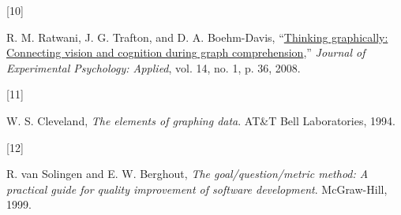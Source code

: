 \documentclass[
  10pt,
  conference,
]{IEEEtran}%
\newlength{\cslhangindent}
\newlength{\csllabelwidth}
\newenvironment{CSLReferences}[2] %
 {\begin{list}{}{%
  \setlength{\itemindent}{0pt}
  \setlength{\leftmargin}{0pt}
  \setlength{\parsep}{0pt}
  \ifodd #1
   \setlength{\leftmargin}{\cslhangindent}
   \setlength{\itemindent}{-1\cslhangindent}
  \fi
  \setlength{\itemsep}{#2\baselineskip}}}
 {\end{list}}
\newcommand{\CSLLeftMargin}[1]{\parbox[t]{\csllabelwidth}{\strut#1\strut}}
\newcommand{\CSLRightInline}[1]{\parbox[t]{\linewidth - \csllabelwidth}{\strut#1\strut}}
\providecommand{\bibfont}{\footnotesize}
\begin{document}
\begin{CSLReferences}{0}{0}
\CSLLeftMargin{{[}10{]} }%
\CSLRightInline{R. M. Ratwani, J. G. Trafton, and D. A. Boehm-Davis,
{``\href{https://doi.org/10.1037/1076-898X.14.1.36}{Thinking
graphically: Connecting vision and cognition during graph
comprehension},''} \emph{Journal of Experimental Psychology: Applied},
vol. 14, no. 1, p. 36, 2008. }

\CSLLeftMargin{{[}11{]} }%
\CSLRightInline{W. S. Cleveland, \emph{The elements of graphing data}.
AT\&T Bell Laboratories, 1994. }

\CSLLeftMargin{{[}12{]} }%
\CSLRightInline{R. van Solingen and E. W. Berghout, \emph{The
goal/question/metric method: A practical guide for quality improvement
of software development}. McGraw-Hill, 1999. }

\end{CSLReferences}


\ifCLASSOPTIONcaptionsoff
  \newpage
\fi



\pagebreak[3]
\end{document}
